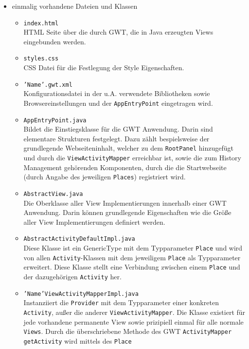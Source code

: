 \begin{itemize}
  \item einmalig vorhandene Dateien und Klassen
  \begin{itemize}
    \item \texttt{index.html}\\
    HTML Seite über die durch GWT, die in Java erzeugten Views
    eingebunden werden.
    \item \texttt{styles.css}\\
    CSS Datei für die Festlegung der Style Eigenschaften.
    \item \texttt{'Name'.gwt.xml}\\
    Konfigurationsdatei in der u.A. verwendete Bibliotheken sowie
    Browsereinstellungen und der \texttt{AppEntryPoint} eingetragen wird.
    \item \texttt{AppEntryPoint.java}\\
    Bildet die Einstiegsklasse für die GWT Anwendung. Darin sind elementare
    Strukturen festgelegt. Dazu zählt bespielsweise der grundlegende
    Webseiteninhalt, welcher zu dem \texttt{RootPanel} hinzugefügt und durch die
    \texttt{ViewActivityMapper} erreichbar ist, sowie die zum
    History Management gehörenden Komponenten, durch die die Startwebseite
    (durch Angabe des jeweiligen \texttt{Places}) registriert wird.
    \item \texttt{AbstractView.java}\\
    Die Oberklasse aller View Implementierungen innerhalb einer GWT
    Anwendung. Darin können grundlegende Eigenschaften wie die Größe aller
    View Implementierungen definiert werden.
    \item \texttt{AbstractActivityDefaultImpl.java}\\
    Diese Klasse ist ein GenericType mit dem Typparameter \texttt{Place} und
    wird von allen \texttt{Activity}-Klassen mit dem jeweiligem
    \texttt{Place} als Typparameter erweitert. 
 	Diese Klasse stellt eine Verbindung zwischen einem \texttt{Place} und der
 	dazugehörigen \texttt{Activity} her.
    \item \texttt{'Name'ViewActivityMapperImpl.java}\\
    Instanziiert die \texttt{Provider} mit dem Typparameter
    einer konkreten \texttt{Activity}, außer die anderer
    \texttt{ViewActivityMapper}. Die Klasse existiert für jede vorhandene
    permanente View sowie prizipiell einmal für alle normale
    \texttt{Views}. Durch die überschriebene Methode des GWT
    \texttt{ActivityMapper} \texttt{getActivity} wird mittels des \texttt{Place}

\end{itemize}
\end{itemize}
